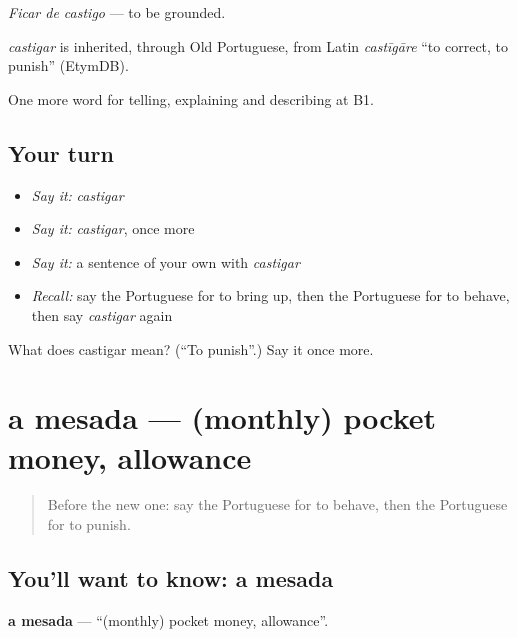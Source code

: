 \emph{Ficar de castigo} — to be grounded.

\begin{cousinweb}
\emph{castigar} is inherited, through Old Portuguese, from Latin \emph{castīgāre} \textquotedblleft{}to correct, to punish\textquotedblright{} (EtymDB).
\end{cousinweb}

\begin{grammarlens}[title={What you've built}]
One more word for telling, explaining and describing at B1.
\end{grammarlens}

\subsection*{Your turn}
\begin{itemize}
\raggedright
  \item \emph{Say it:} \emph{castigar}
  \item \emph{Say it:} \emph{castigar}, once more
  \item \emph{Say it:} a sentence of your own with \emph{castigar}
  \item \emph{Recall:} say the Portuguese for to bring up, then the Portuguese for to behave, then say \emph{castigar} again
\end{itemize}

\begin{tcolorbox}[breakable,colback=teal!4,colframe=teal!35!black,title={Before you move on}]
What does castigar mean? (\textquotedblleft{}To punish\textquotedblright{}.) Say it once more.
\end{tcolorbox}
\section[a mesada]{a mesada — (monthly) pocket money, allowance}

\label{lesson:PT-C495-mesada}



\begin{quote}
Before the new one: say the Portuguese for to behave, then the Portuguese for to punish.
\end{quote}

\subsection*{You'll want to know: a mesada}
\textbf{a mesada} — \textquotedblleft{}(monthly) pocket money, allowance\textquotedblright{}.

